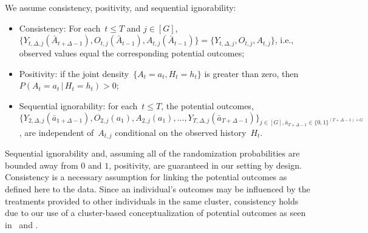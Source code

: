 \documentclass[lineno]{biometrika}
\def\given{\, | \,}
\begin{document}
\begin{assumption} \normalfont
  \label{consistency}
  We assume consistency, positivity, and sequential ignorability:
  \begin{itemize}
  \item Consistency: For each~$t \leq T$ and $j \in [G]$,
    $\{Y_{t,\Delta,j} (\bar{A}_{t+\Delta-1} ), O_{t,j} (\bar A_{t-1}), A_{t,j} (\bar{A}_{t-1} )\}  = \{Y_{t, \Delta, j}, O_{t,j}, A_{t,j}\}$, i.e., observed values equal the corresponding potential outcomes;
  \item Positivity: if the joint density~$\{ A_t = a_t, H_t = h_t\}$ is greater
    than zero, then~$P (A_t = a_t \given H_t = h_t ) > 0$;
  \item Sequential ignorability: for each~$t \leq T$, the
    potential outcomes,\\ $\{Y_{2,\Delta,j} ( \bar a_{1+\Delta-1}), O_{2,j}(a_{1}),A_{2,j}( a_{1}), \ldots,
    Y_{T,\Delta, j} (\bar a_{T+\Delta-1}) \}_{j \in [G], \bar a_{T+\Delta-1}\in \{0,1\}^{(T+\Delta-1)\times G}}$, are independent of~$A_{t,j}$ conditional on the observed history~$H_t$.
  \end{itemize}
\end{assumption}

Sequential ignorability and, assuming all of the randomization probabilities are bounded away from $0$ and $1$, positivity, are guaranteed in our setting  by design. 
Consistency is a necessary assumption for linking the potential outcomes as defined here to the data. Since an individual's outcomes may be influenced by the treatments provided to other individuals in the same cluster, consistency holds due to our use of a cluster-based conceptualization of potential outcomes as seen in~\cite{Hong2006} and \cite{Vanderweele2013}.
\end{document}

